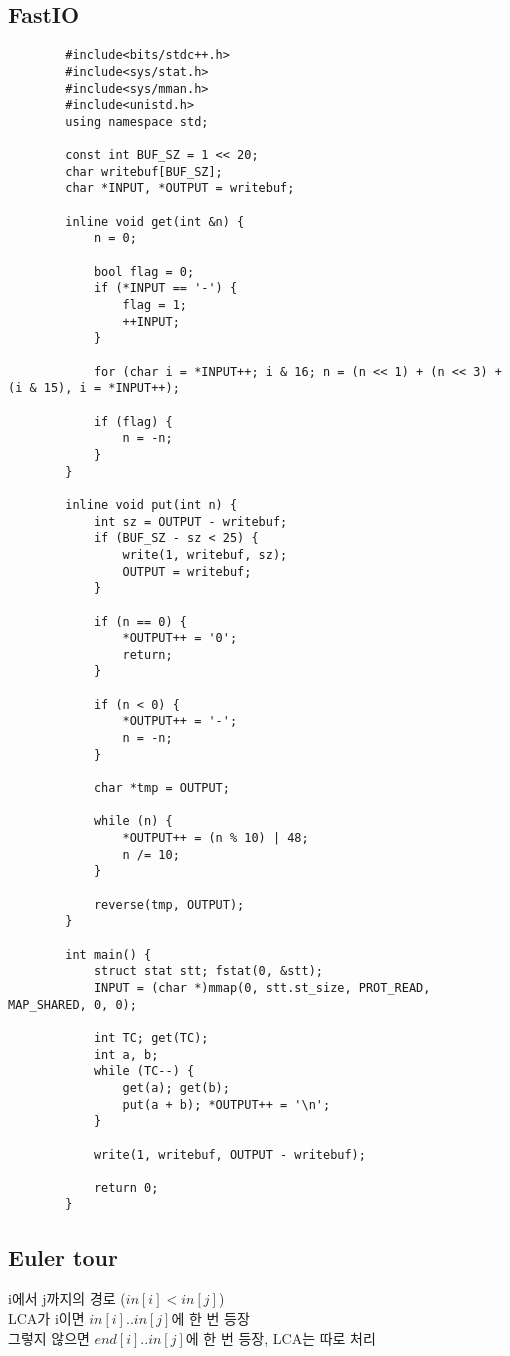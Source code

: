 \documentclass[landscape, 8pt, a4paper, oneside, twocolumn]{extarticle}
\begin{document}
	\subsection {FastIO}
	\begin{verbatim}
		#include<bits/stdc++.h>
		#include<sys/stat.h>
		#include<sys/mman.h>
		#include<unistd.h>
		using namespace std;
		
		const int BUF_SZ = 1 << 20;
		char writebuf[BUF_SZ];
		char *INPUT, *OUTPUT = writebuf;
		
		inline void get(int &n) {
			n = 0;
			
			bool flag = 0;
			if (*INPUT == '-') {
				flag = 1;
				++INPUT;
			}
			
			for (char i = *INPUT++; i & 16; n = (n << 1) + (n << 3) + (i & 15), i = *INPUT++);
			
			if (flag) {
				n = -n;
			}
		}
		
		inline void put(int n) {
			int sz = OUTPUT - writebuf;
			if (BUF_SZ - sz < 25) {
				write(1, writebuf, sz);
				OUTPUT = writebuf;
			}
			
			if (n == 0) {
				*OUTPUT++ = '0';
				return;
			}
			
			if (n < 0) {
				*OUTPUT++ = '-';
				n = -n;
			}
			
			char *tmp = OUTPUT;
			
			while (n) {
				*OUTPUT++ = (n % 10) | 48;
				n /= 10;
			}
			
			reverse(tmp, OUTPUT);
		}
		
		int main() {
			struct stat stt; fstat(0, &stt);
			INPUT = (char *)mmap(0, stt.st_size, PROT_READ, MAP_SHARED, 0, 0);
			
			int TC; get(TC);
			int a, b;
			while (TC--) {
				get(a); get(b);
				put(a + b); *OUTPUT++ = '\n';
			}
			
			write(1, writebuf, OUTPUT - writebuf);
			
			return 0;
		}
	\end{verbatim}
	\subsection {Euler tour}
	\noindent
	i에서 j까지의 경로 ($in[i] < in[j]$)\\
	LCA가 i이면 $in[i] .. in[j]$에 한 번 등장\\ 
	그렇지 않으면 $end[i] .. in[j]$에 한 번 등장, LCA는 따로 처리\\
\end{document}
